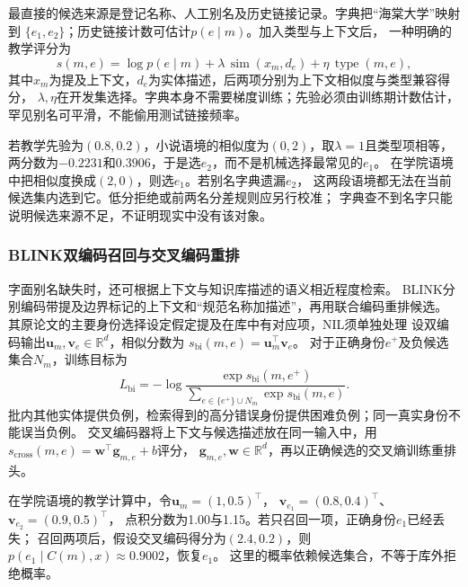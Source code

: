 最直接的候选来源是登记名称、人工别名及历史链接记录。字典把“海棠大学”映射到
$\{e_1,e_2\}$；历史链接计数可估计$p(e\mid m)$。加入类型与上下文后，
一种明确的教学评分为
\begin{equation}
  s(m,e)=\log p(e\mid m)+
  \lambda\,\operatorname{sim}(x_m,d_e)+
  \eta\,\operatorname{type}(m,e),
  \label{eq:nlp-extraction-alias}
\end{equation}
其中$x_m$为提及上下文，$d_e$为实体描述，后两项分别为上下文相似度与类型兼容得分，
$\lambda,\eta$在开发集选择。字典本身不需要梯度训练；先验必须由训练期计数估计，
罕见别名可平滑，不能偷用测试链接频率。

若教学先验为$(0.8,0.2)$，小说语境的相似度为$(0,2)$，取$\lambda=1$且类型项相等，
两分数为$-0.2231$和$0.3906$，于是选$e_2$，而不是机械选择最常见的$e_1$。
在学院语境中把相似度换成$(2,0)$，则选$e_1$。若别名字典遗漏$e_2$，
这两段语境都无法在当前候选集内选到它。低分拒绝或前两名分差规则应另行校准；
字典查不到名字只能说明候选来源不足，不证明现实中没有该对象。

\subsubsection{BLINK双编码召回与交叉编码重排}
\label{sec:nlp-extraction-blink}

字面别名缺失时，还可根据上下文与知识库描述的语义相近程度检索。
BLINK分别编码带提及边界标记的上下文和“规范名称加描述”，再用联合编码重排候选。
其原论文的主要身份选择设定假定提及在库中有对应项，NIL须单独处理
设双编码输出$\bm{u}_m,\bm{v}_e\in\mathbb{R}^{d}$，相似分数为
$s_{\mathrm{bi}}(m,e)=\bm{u}_m^\top\bm{v}_e$。
对于正确身份$e^+$及负候选集合$N_m$，训练目标为
\begin{equation}
  L_{\mathrm{bi}}=
  -\log\frac{\exp s_{\mathrm{bi}}(m,e^+)}
  {\sum_{e\in\{e^+\}\cup N_m}\exp s_{\mathrm{bi}}(m,e)}.
  \label{eq:nlp-extraction-blink}
\end{equation}
批内其他实体提供负例，检索得到的高分错误身份提供困难负例；同一真实身份不能误当负例。
交叉编码器将上下文与候选描述放在同一输入中，用
$s_{\mathrm{cross}}(m,e)=\bm{w}^{\top}\bm{g}_{m,e}+b$评分，
$\bm{g}_{m,e},\bm{w}\in\mathbb{R}^{d}$，再以正确候选的交叉熵训练重排头。

在学院语境的教学计算中，令$\bm{u}_m=(1,0.5)^\top$，
$\bm{v}_{e_1}=(0.8,0.4)^\top$、$\bm{v}_{e_2}=(0.9,0.5)^\top$，
点积分数为1.00与1.15。若只召回一项，正确身份$e_1$已经丢失；
召回两项后，假设交叉编码得分为$(2.4,0.2)$，则
$p(e_1\mid C(m),x)\approx0.9002$，恢复$e_1$。
这里的概率依赖候选集合，不等于库外拒绝概率。


